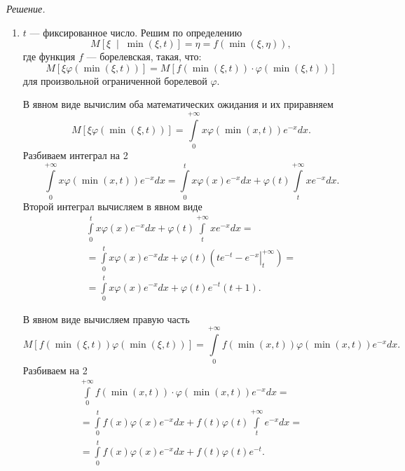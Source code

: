 \textit{Решение.}
\begin{enumerate}[label=\alph*)]
  \item $t$ --- фиксированное число.
  Решим по определению
  $$M \left[ \xi \; \middle| \; \min \left( \xi, t \right) \right] =
    \eta =
    f \left( \min \left( \xi, \eta \right) \right),$$
  где функция $f$ --- борелевская, такая, что:
  $$M \left[ \xi \varphi \left( \min \left( \xi, t \right) \right) \right] =
    M \left[ f \left( \min \left( \xi, t \right) \right) \cdot
    \varphi \left( \min \left( \xi, t \right) \right) \right] $$
  для произвольной ограниченной борелевой $ \varphi $.

  В явном виде вычислим оба математических ожидания и их приравняем
  $$M \left[ \xi \varphi \left( \min \left( \xi, t \right) \right) \right] =
    \int \limits_0^{+ \infty } x \varphi \left( \min \left( x, t \right) \right) e^{-x} dx.$$
  Разбиваем интеграл на 2
  $$ \int \limits_0^{+ \infty } x \varphi \left( \min \left( x, t \right) \right) e^{-x} dx =
    \int \limits_0^t x \varphi \left( x \right) e^{-x} dx +
    \varphi \left( t \right) \int \limits_t^{+ \infty } xe^{-x} dx.$$
  Второй интеграл вычисляем в явном виде
  \begin{equation*}
    \begin{split}
      \int \limits_0^t x \varphi \left( x \right) e^{-x} dx +
      \varphi \left( t \right) \int \limits_t^{+ \infty } xe^{-x} dx = \\
      = \int \limits_0^t x \varphi \left( x \right) e^{-x} dx +
      \varphi \left( t \right) \left( \left. te^{-t} - e^{-x} \right|_t^{+ \infty } \right) = \\
      = \int \limits_0^t x \varphi \left( x \right) e^{-x} dx +
      \varphi \left( t \right) e^{-t} \left( t + 1 \right).
    \end{split}
  \end{equation*}

  В явном виде вычисляем правую часть
  $$M \left[
    f \left( \min \left( \xi, t \right) \right) \varphi \left( \min \left( \xi, t \right) \right)
  \right] =
  \int \limits_0^{+ \infty }
    f \left( \min \left( x, t \right) \right) \varphi \left( \min \left( x, t \right) \right) e^{-x}
  dx.$$
  Разбиваем на 2
  \begin{equation*}
    \begin{split}
      \int \limits_0^{+ \infty }
        f \left( \min \left( x, t \right) \right) \cdot
        \varphi \left( \min \left( x, t \right) \right) e^{-x}
      dx = \\
      = \int \limits_0^t f \left( x \right) \varphi \left( x \right) e^{-x} dx +
      f \left( t \right) \varphi \left( t \right) \int \limits_t^{+ \infty } e^{-x} dx = \\
      = \int \limits_0^t f \left( x \right) \varphi \left( x \right) e^{-x} dx +
      f \left( t \right) \varphi \left( t \right) e^{-t}.
    \end{split}
  \end{equation*}


\end{enumerate}
